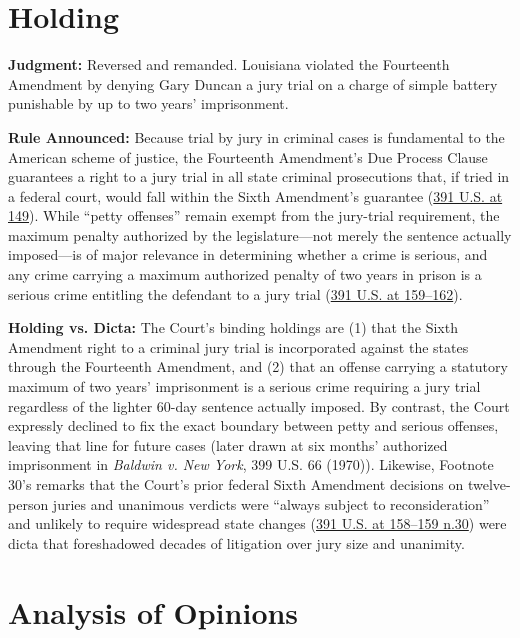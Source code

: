 \documentclass[12pt]{article}
\begin{document}
\section{Holding}

\textbf{Judgment:} Reversed and remanded. Louisiana violated the Fourteenth Amendment by denying Gary Duncan a jury trial on a charge of simple battery punishable by up to two years' imprisonment.

\textbf{Rule Announced:} Because trial by jury in criminal cases is fundamental to the American scheme of justice, the Fourteenth Amendment's Due Process Clause guarantees a right to a jury trial in all state criminal prosecutions that, if tried in a federal court, would fall within the Sixth Amendment's guarantee (\href{https://supreme.justia.com/cases/federal/us/391/145/}{391 U.S. at 149}). While ``petty offenses'' remain exempt from the jury-trial requirement, the maximum penalty authorized by the legislature---not merely the sentence actually imposed---is of major relevance in determining whether a crime is serious, and any crime carrying a maximum authorized penalty of two years in prison is a serious crime entitling the defendant to a jury trial (\href{https://supreme.justia.com/cases/federal/us/391/145/}{391 U.S. at 159--162}).

\textbf{Holding vs. Dicta:} The Court's binding holdings are (1) that the Sixth Amendment right to a criminal jury trial is incorporated against the states through the Fourteenth Amendment, and (2) that an offense carrying a statutory maximum of two years' imprisonment is a serious crime requiring a jury trial regardless of the lighter 60-day sentence actually imposed. By contrast, the Court expressly declined to fix the exact boundary between petty and serious offenses, leaving that line for future cases (later drawn at six months' authorized imprisonment in \textit{Baldwin v. New York}, 399 U.S. 66 (1970)). Likewise, Footnote 30's remarks that the Court's prior federal Sixth Amendment decisions on twelve-person juries and unanimous verdicts were ``always subject to reconsideration'' and unlikely to require widespread state changes (\href{https://supreme.justia.com/cases/federal/us/391/145/}{391 U.S. at 158--159 n.30}) were dicta that foreshadowed decades of litigation over jury size and unanimity.

\section{Analysis of Opinions}
\end{document}
